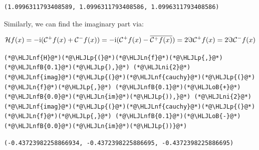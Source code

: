 \documentclass[12pt,a4paper]{article}
\newcommand{\HLJLn}[1]{#1}
\newcommand{\HLJLnf}[1]{\textcolor[RGB]{66,102,213}{#1}}
\newcommand{\HLJLnfB}[1]{\textcolor[RGB]{59,151,46}{#1}}
\newcommand{\HLJLni}[1]{\textcolor[RGB]{59,151,46}{#1}}
\newcommand{\HLJLoB}[1]{\textcolor[RGB]{102,102,102}{\textbf{#1}}}
\newcommand{\HLJLp}[1]{#1}
\def\I{ {\rm i} }
\def\CC{ {\cal C} }
\begin{document}
\begin{lstlisting}
(1.0996311793408589, 1.0996311793408586, 1.0996311793408586)
\end{lstlisting}


Similarly, we can find the imaginary part via:

\[
{\cal H} f(x) = -\I(\CC^+ f(x) + \CC^- f(x)) = -\I(\CC^+ f(x) - \overline{\CC^+ f(x)}) = 2 \Im \CC^+ f(x) = 2 \Im \CC^- f(x)
\]

\begin{lstlisting}
(*@\HLJLnf{H}@*)(*@\HLJLp{(}@*)(*@\HLJLn{f}@*)(*@\HLJLp{,}@*) (*@\HLJLnfB{0.1}@*)(*@\HLJLp{),}@*) (*@\HLJLni{2}@*)(*@\HLJLnf{imag}@*)(*@\HLJLp{(}@*)(*@\HLJLnf{cauchy}@*)(*@\HLJLp{(}@*)(*@\HLJLn{f}@*)(*@\HLJLp{,}@*) (*@\HLJLnfB{0.1}@*)(*@\HLJLoB{+}@*)(*@\HLJLnfB{0.0}@*)(*@\HLJLn{im}@*)(*@\HLJLp{)),}@*) (*@\HLJLni{2}@*)(*@\HLJLnf{imag}@*)(*@\HLJLp{(}@*)(*@\HLJLnf{cauchy}@*)(*@\HLJLp{(}@*)(*@\HLJLn{f}@*)(*@\HLJLp{,}@*) (*@\HLJLnfB{0.1}@*)(*@\HLJLoB{-}@*)(*@\HLJLnfB{0.0}@*)(*@\HLJLn{im}@*)(*@\HLJLp{))}@*)
\end{lstlisting}

\begin{lstlisting}
(-0.43723982258866934, -0.4372398225886695, -0.4372398225886695)
\end{lstlisting}
\end{document}
